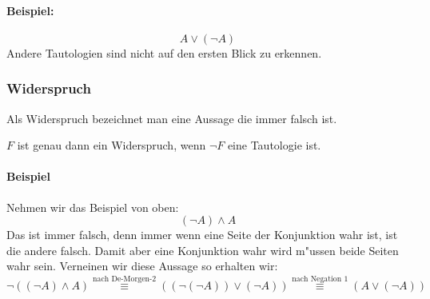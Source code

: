 \paragraph*{Beispiel:}
\begin{equation*}
A \lor (\neg A)
\end{equation*}
Andere Tautologien sind nicht auf den ersten Blick zu erkennen.

\subsubsection{Widerspruch}
Als Widerspruch bezeichnet man eine Aussage die immer falsch ist. 
\begin{axiom}[Widerspruch]
$F$ ist genau dann ein Widerspruch, wenn $\neg F$ eine Tautologie ist.
\end{axiom}

\paragraph*{Beispiel}
Nehmen wir das Beispiel von oben:
\begin{equation*}
(\neg A) \land A
\end{equation*}
Das ist immer falsch, denn immer wenn eine Seite der Konjunktion wahr ist, ist die andere falsch. Damit aber eine Konjunktion wahr wird m"ussen beide Seiten wahr sein. Verneinen wir diese Aussage so erhalten wir:
\begin{equation*}
\neg ((\neg A) \land A) \stackrel{\text{nach De-Morgen-2}}{\equiv} ((\neg (\neg A)) \lor (\neg A)) \stackrel{\text{nach Negation 1}}{\equiv} (A \lor (\neg A))
\end{equation*} 

